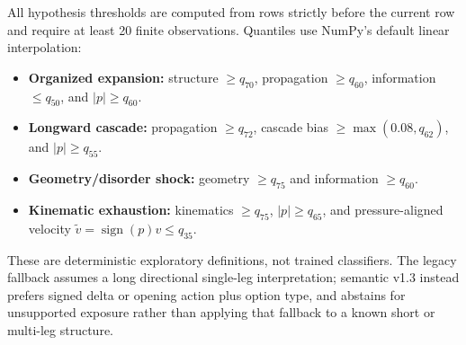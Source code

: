 \documentclass{article}
\begin{document}
All hypothesis thresholds are computed from rows strictly before the current row and require at least 20 finite observations. Quantiles use NumPy's default linear interpolation:
\begin{itemize}
    \item \textbf{Organized expansion:} structure $\ge q_{70}$, propagation $\ge q_{60}$, information $\le q_{50}$, and $|p|\ge q_{60}$.
    \item \textbf{Longward cascade:} propagation $\ge q_{72}$, cascade bias $\ge\max(0.08,q_{62})$, and $|p|\ge q_{55}$.
    \item \textbf{Geometry/disorder shock:} geometry $\ge q_{75}$ and information $\ge q_{60}$.
    \item \textbf{Kinematic exhaustion:} kinematics $\ge q_{75}$, $|p|\ge q_{65}$, and pressure-aligned velocity $\widetilde v=\operatorname{sign}(p)v\le q_{35}$.
\end{itemize}
These are deterministic exploratory definitions, not trained classifiers. The legacy fallback assumes a long directional single-leg interpretation; semantic v1.3 instead prefers signed delta or opening action plus option type, and abstains for unsupported exposure rather than applying that fallback to a known short or multi-leg structure.
\end{document}
